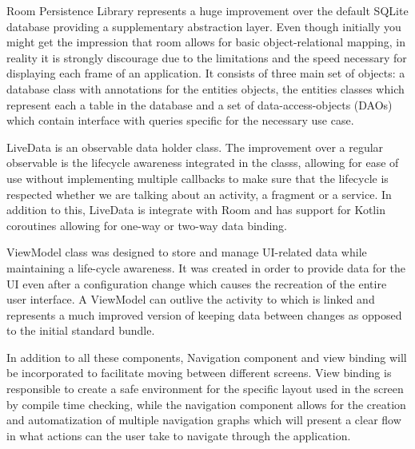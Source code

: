 Room Persistence Library represents a huge improvement over the default SQLite database providing a supplementary abstraction layer. Even though initially you might get the impression that room allows for basic object-relational mapping, in reality it is strongly discourage due to the limitations and the speed necessary for displaying each frame of an application. It consists of three main set of objects: a database class with annotations for the entities objects, the entities classes which represent each a table in the database and a set of data-access-objects (DAOs) which contain interface with queries specific for the necessary use case. 

LiveData is an observable data holder class. The improvement over a regular observable is the lifecycle awareness integrated in the classs, allowing for ease of use without implementing multiple callbacks to make sure that the lifecycle is respected whether we are talking about an activity, a fragment or a service. In addition to this, LiveData is integrate with Room and has support for Kotlin coroutines allowing for one-way or two-way data binding.

ViewModel class was designed to store and manage UI-related data while maintaining a life-cycle awareness. It was created in order to provide data for the UI even after a configuration change which causes the recreation of the entire user interface. A ViewModel can outlive the activity to which is linked and represents a much improved version of keeping data between changes as opposed to the initial standard bundle.

In addition to all these components, Navigation component and view binding will be incorporated to facilitate moving between different screens. View binding is responsible to create a safe environment for the specific layout used in the screen by compile time checking, while the navigation component allows for the creation and automatization of multiple navigation graphs which will present a clear flow in what actions can the user take to navigate through the application.